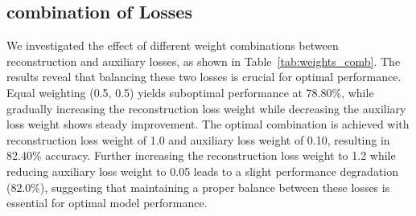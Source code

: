 \begin{table}[htbp]
    \centering
    \caption{Accuracy results for different weight of auxiliary loss}
    \label{tab:weights_accuracy}
\end{table}

\subsection{combination of Losses}

We investigated the effect of different weight combinations between reconstruction and auxiliary losses, as shown in Table~\ref{tab:weights_comb}. The results reveal that balancing these two losses is crucial for optimal performance. Equal weighting (0.5, 0.5) yields suboptimal performance at 78.80\%, while gradually increasing the reconstruction loss weight while decreasing the auxiliary loss weight shows steady improvement. The optimal combination is achieved with reconstruction loss weight of 1.0 and auxiliary loss weight of 0.10, resulting in 82.40\% accuracy. Further increasing the reconstruction loss weight to 1.2 while reducing auxiliary loss weight to 0.05 leads to a slight performance degradation (82.0\%), suggesting that maintaining a proper balance between these losses is essential for optimal model performance.

\begin{table}[htbp]
    \centering
    \caption{Accuracy results for different combination of reconstruction and auxiliary loss weights}
    \label{tab:weights_comb}
\end{table}

